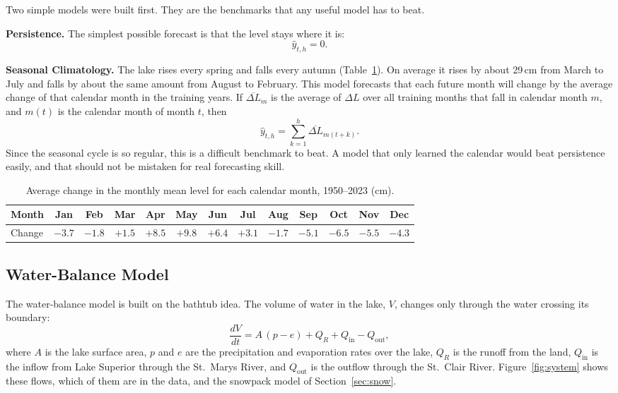 \documentclass{article}
\begin{document}
Two simple models were built first. They are the benchmarks that any useful model has to beat.

\textbf{Persistence.} The simplest possible forecast is that the level stays where it is:
\begin{equation}
\hat y_{t,h} = 0. \label{eq:persistence}
\end{equation}

\textbf{Seasonal Climatology.} The lake rises every spring and falls every autumn
(Table~\ref{tab:clim}). On average it rises by about 29\,cm from March to July and falls by
about the same amount from August to February. This model forecasts that each future month will
change by the average change of that calendar month in the training years. If
$\overline{\Delta L}_m$ is the average of $\Delta L$ over all training months that fall in
calendar month $m$, and $m(t)$ is the calendar month of month $t$, then
\begin{equation}
\hat y_{t,h} = \sum_{k=1}^{h} \overline{\Delta L}_{m(t+k)}. \label{eq:climatology}
\end{equation}
Since the seasonal cycle is so regular, this is a difficult benchmark to beat. A model that only
learned the calendar would beat persistence easily, and that should not be mistaken for real
forecasting skill.

\begin{table}[htbp]
\centering
\caption{Average change in the monthly mean level for each calendar month, 1950--2023 (cm).}
\label{tab:clim}
\small
\begin{tabular}{||l|c|c|c|c|c|c|c|c|c|c|c|c||}
\hline\hline
Month & Jan & Feb & Mar & Apr & May & Jun & Jul & Aug & Sep & Oct & Nov & Dec \\
\hline\hline
Change & $-3.7$ & $-1.8$ & $+1.5$ & $+8.5$ & $+9.8$ & $+6.4$ & $+3.1$ & $-1.7$ & $-5.1$
& $-6.5$ & $-5.5$ & $-4.3$ \\
\hline\hline
\end{tabular}
\end{table}

\subsection{Water-Balance Model}
\label{sec:wb}

The water-balance model is built on the bathtub idea. The volume of water in the lake, $V$,
changes only through the water crossing its boundary:
\begin{equation}
\frac{dV}{dt} = A\,(p - e) + Q_R + Q_{\mathrm{in}} - Q_{\mathrm{out}}, \label{eq:volume}
\end{equation}
where $A$ is the lake surface area, $p$ and $e$ are the precipitation and evaporation rates over
the lake, $Q_R$ is the runoff from the land, $Q_{\mathrm{in}}$ is the inflow from Lake Superior
through the St.~Marys River, and $Q_{\mathrm{out}}$ is the outflow through the St.~Clair River.
Figure~\ref{fig:system} shows these flows, which of them are in the data, and the snowpack model
of Section~\ref{sec:snow}.
\end{document}
